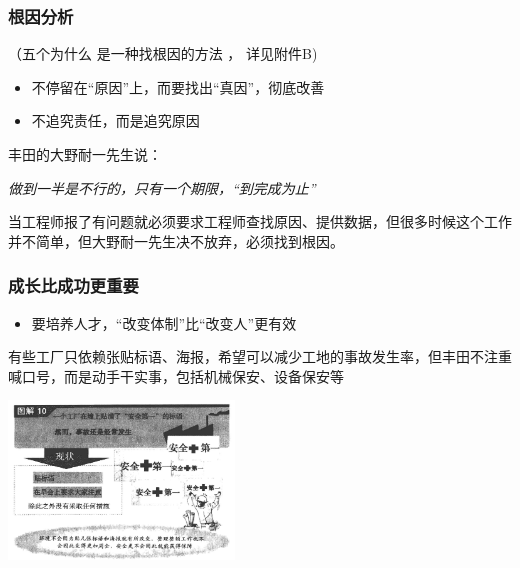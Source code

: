 \hypertarget{ux6839ux56e0ux5206ux6790}{%
\subsubsection{根因分析}\label{ux6839ux56e0ux5206ux6790}}

（五个为什么 是一种找根因的方法 ， 详见附件B)

\begin{itemize}
\tightlist
\item
  不停留在``原因''上，而要找出``真因''，彻底改善
\item
  不追究责任，而是追究原因\\
\end{itemize}

丰田的大野耐一先生说：

\begin{description}
\tightlist
\item[]
\emph{做到一半是不行的，只有一个期限，``到完成为止''}
\end{description}

当工程师报了有问题就必须要求工程师查找原因、提供数据，但很多时候这个工作并不简单，但大野耐一先生决不放弃，必须找到根因。

\hypertarget{ux6210ux957fux6bd4ux6210ux529fux66f4ux91cdux8981}{%
\subsubsection{成长比成功更重要}\label{ux6210ux957fux6bd4ux6210ux529fux66f4ux91cdux8981}}

\begin{itemize}
\tightlist
\item
  要培养人才，``改变体制''比``改变人''更有效
\end{itemize}

有些工厂只依赖张贴标语、海报，希望可以减少工地的事故发生率，但丰田不注重喊口号，而是动手干实事，包括机械保安、设备保安等


\includegraphics[width=6cm]{ft_2231.png}

